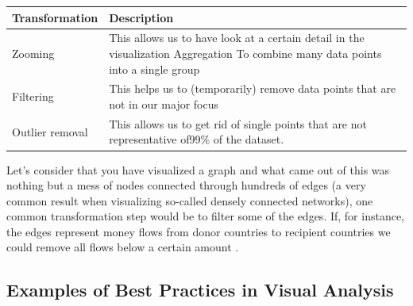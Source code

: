 \documentclass[]{book}
\theoremstyle{definition}
\theoremstyle{definition}
\theoremstyle{definition}
\theoremstyle{remark}
\begin{document}
\begin{longtable}[]{@{}ll@{}}
\toprule
\begin{minipage}[b]{0.18\columnwidth}\raggedright\strut
\textbf{Transformation}\strut
\end{minipage} & \begin{minipage}[b]{0.68\columnwidth}\raggedright\strut
\textbf{Description}\strut
\end{minipage}\tabularnewline
\midrule
\endhead
\begin{minipage}[t]{0.18\columnwidth}\raggedright\strut
Zooming\strut
\end{minipage} & \begin{minipage}[t]{0.68\columnwidth}\raggedright\strut
This allows us to have look at a certain detail in the visualization
Aggregation To combine many data points into a single group\strut
\end{minipage}\tabularnewline
\begin{minipage}[t]{0.18\columnwidth}\raggedright\strut
Filtering\strut
\end{minipage} & \begin{minipage}[t]{0.68\columnwidth}\raggedright\strut
This helps us to (temporarily) remove data points that are not in our
major focus\strut
\end{minipage}\tabularnewline
\begin{minipage}[t]{0.18\columnwidth}\raggedright\strut
Outlier removal\strut
\end{minipage} & \begin{minipage}[t]{0.68\columnwidth}\raggedright\strut
This allows us to get rid of single points that are not representative
of99\% of the dataset.\strut
\end{minipage}\tabularnewline
\bottomrule
\end{longtable}

Let's consider that you have visualized a graph and what came out of
this was nothing but a mess of nodes connected through hundreds of edges
(a very common result when visualizing so-called densely connected
networks), one common transformation step would be to filter some of the
edges. If, for instance, the edges represent money flows from donor
countries to recipient countries we could remove all flows below a
certain amount \citep{DataVizBestPrac}.

\subsection{Examples of Best Practices in Visual
Analysis}\label{examples-of-best-practices-in-visual-analysis}
\end{document}
